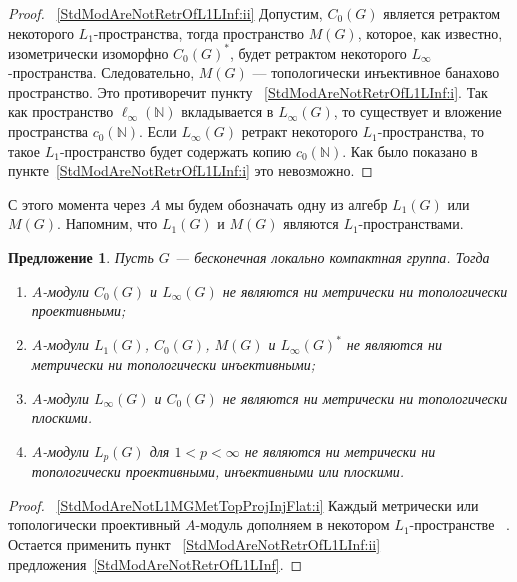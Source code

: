 \documentclass{article}
\numberwithin{equation}{section}
\theoremstyle{plain}
\newtheorem{propos}{Предложение}
\theoremstyle{definition}
\newtheorem{proof}{Доказательство}\def\theproof{}
\begin{document}
\begin{fulltext}
\begin{proof}
~\ref{StdModAreNotRetrOfL1LInf:ii} Допустим, $C_0(G)$ является ретрактом
некоторого $L_1$-пространства, тогда пространство $M(G)$, которое, как известно,
изометрически изоморфно ${C_0(G)}^*$, будет ретрактом некоторого
$L_\infty$-пространства. Следовательно, $M(G)$ --- топологически инъективное
банахово пространство. Это противоречит пункту
~\ref{StdModAreNotRetrOfL1LInf:i}. Так как пространство
$\ell_\infty(\mathbb{N})$ вкладывается в $L_\infty(G)$, то существует и вложение
пространства $c_0(\mathbb{N})$. Если $L_\infty(G)$ ретракт некоторого
$L_1$-пространства, то такое $L_1$-пространство будет содержать копию
$c_0(\mathbb{N})$. Как было показано в пункте~\ref{StdModAreNotRetrOfL1LInf:i}
это невозможно.
\end{proof}

С этого момента через $A$ мы будем обозначать одну из алгебр $L_1(G)$ или
$M(G)$. Напомним, что $L_1(G)$ и $M(G)$ являются  $L_1$-пространствами.

\begin{propos}\label{StdModAreNotL1MGMetTopProjInjFlat} Пусть $G$ ---
бесконечная локально компактная группа. Тогда
\begin{enumerate}[label = (\roman*)]
    \item $A$-модули $C_0(G)$ и $L_\infty(G)$ не являются ни метрически ни
    топологически проективными;\label{StdModAreNotL1MGMetTopProjInjFlat:i}

    \item $A$-модули $L_1(G)$, $C_0(G)$, $M(G)$ и ${L_\infty(G)}^*$ не являются
    ни метрически ни топологически
    инъективными;\label{StdModAreNotL1MGMetTopProjInjFlat:ii}
 
	\item $A$-модули $L_\infty(G)$ и $C_0(G)$ не являются ни метрически ни
    топологически плоскими.\label{StdModAreNotL1MGMetTopProjInjFlat:iii}
 
	\item $A$-модули $L_p(G)$ для $1<p<\infty$ не являются ни метрически ни
    топологически проективными, инъективными или
    плоскими.\label{StdModAreNotL1MGMetTopProjInjFlat:iv}
\end{enumerate}
\end{propos}
\begin{proof}~\ref{StdModAreNotL1MGMetTopProjInjFlat:i} Каждый метрически или
топологически проективный $A$-модуль дополняем в некотором $L_1$-пространстве
~\cite[предложение~3.8]{NemGeomProjInjFlatBanMod}. Остается применить пункт
~\ref{StdModAreNotRetrOfL1LInf:ii} предложения~\ref{StdModAreNotRetrOfL1LInf}.


\end{proof}
\end{fulltext}
\end{document}
